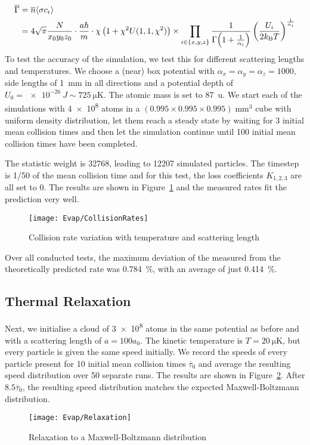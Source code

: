 \begin{align*}
    \overline{\Gamma} &= \overline{n} \langle\sigma c_\text{r}\rangle \\
    &= 4\sqrt{\pi} \frac{N}{x_0y_0z_0} \cdot \frac{a\hbar}{m} \cdot \chi \left(1 + \chi^2U(1,1,\chi^2)\right) \times \prod_{i\in\{x,y,z\}}\frac{1}{\Gamma\!\left(1 + \frac{1}{\alpha_i}\right)}\left(\frac{U_i}{2 k_\text{B} T}\right)^{\frac{1}{\alpha_i}} 
\end{align*}
To test the accuracy of the simulation, we test this for different scattering lengths and temperatures. We choose a (near) box potential with $\alpha_x = \alpha_y = \alpha_z = 1000$, side lengths of \SI{1}{mm} in all directions and a potential depth of $U_0 = \SI{e-26}{J} \sim \SI{725}{\micro\kelvin}$. The atomic mass is set to \SI{87}{u}. We start each of the simulations with \num{4e8} atoms in a $(\num{0.995} \times \num{0.995} \times \num{0.995})\; \si{\milli\meter\cubed}$ cube with uniform density distribution, let them reach a steady state by waiting for 3 initial mean collision times and then let the simulation continue until 100 initial mean collision times have been completed.

The statistic weight is \num{32768}, leading to \num{12207} simulated particles. The timestep is 1/50 of the mean collision time and for this test, the loss coefficients $K_{1,2,3}$ are all set to 0. The results are shown in Figure~\ref{fig:evap_test_rates} and the measured rates fit the prediction very well. 
\begin{figure}[htbp]
    \centering
    \texttt{[image: Evap/CollisionRates]}
    \caption{Collision rate variation with temperature and scattering length}
    \label{fig:evap_test_rates}
\end{figure}
Over all conducted tests, the maximum deviation of the measured from the theoretically predicted rate was \SI{.784}{\percent}, with an average of just \SI{.414}{\percent}.

\subsection{Thermal Relaxation}
Next, we initialise a cloud of \num{3e8} atoms in the same potential as before and with a scattering length of $a = 100a_0$. The kinetic temperature is $T=\SI{20}{\micro\kelvin}$, but every particle is given the same speed initially. We record the speeds of every particle present for 10 initial mean collision times $\overline{\tau}_0$ and average the resulting speed distribution over 50 separate runs. The results are shown in Figure~\ref{fig:evap_relaxation}. After $\num{8.5}\overline{\tau}_0$, the resulting speed distribution matches the expected Maxwell-Boltzmann distribution.
\begin{figure}[htbp]
    \centering
    \texttt{[image: Evap/Relaxation]}
    \caption{Relaxation to a Maxwell-Boltzmann distribution}
    \label{fig:evap_relaxation}
\end{figure}

